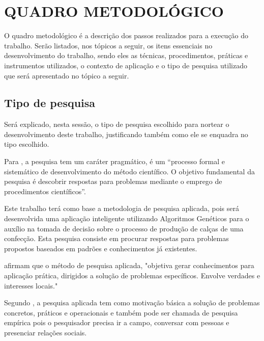 \chapter{QUADRO METODOLÓGICO}
\par O quadro metodológico é a descrição dos passos realizados para a 
execução do trabalho. Serão listados, nos tópicos a seguir, os itens essenciais
no desenvolvimento do trabalho, sendo eles as técnicas, procedimentos, práticas e instrumentos
utilizados, o contexto de aplicação e o tipo de pesquisa utilizado que será apresentado no tópico a seguir.

\section{Tipo de pesquisa}

\par Será explicado, nesta sessão, o tipo de pesquisa escolhido para nortear o
desenvolvimento deste trabalho, justificando também como ele se enquadra no tipo
escolhido.

\par Para , a pesquisa tem um caráter
pragmático, é um “processo formal e sistemático de desenvolvimento do método científico. 
O objetivo fundamental da pesquisa é descobrir respostas para problemas mediante
o emprego de procedimentos científicos”.

\par Este trabalho terá como base a metodologia de pesquisa aplicada, pois
será desenvolvida uma aplicação inteligente utilizando Algoritmos Genéticos para
o auxílio na tomada de decisão sobre o processo de produção de calças de uma
confecção. Esta pesquisa consiste em procurar respostas para problemas propostos
baseados em padrões e conhecimentos já existentes.

\par {} afirmam que o método de
pesquisa aplicada, "objetiva gerar conhecimentos para aplicação prática, dirigidos a
solução de problemas específicos. Envolve verdades e interesses locais."  

\par Segundo , a pesquisa
aplicada tem como motivação básica a solução de problemas
concretos, práticos e operacionais e também pode ser chamada de pesquisa
empírica pois o pesquisador precisa ir a campo, conversar com pessoas e
presenciar relações sociais.

